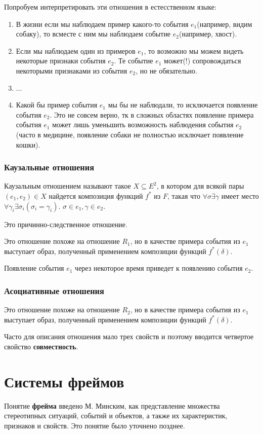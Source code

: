 Попробуем интерпретировать эти отношения в естесственном языке:
\begin{enumerate}
	\item В жизни если мы наблюдаем пример какого-то события $e_1$(например, видим собаку), то всместе с ним мы наблюдаем событие $e_2$(например, хвост).
	\item Если мы наблюдаем один из примеров $e_1$, то возможно мы можем видеть некоторые признаки события $e_2$. Те событие $e_1$ может(!) сопровождаться некоторыми признаками из события $e_2$, но не обязательно.
	\item ...
	\item Какой бы пример события $e_1$ мы бы не наблюдали, то исключается появление события $e_2$. Это не совсем верно, тк в сложных областях появление примера события $e_1$ может лишь уменьшить возможность наблюдения события $e_2$(часто в медицине, появление собаки не полностью исключает появление кошки).
\end{enumerate}

\subsubsection{Каузальные отношения}
Каузальным отношением называют такое $X\subseteq{}E^2$, в котором для всякой пары $(e_1,e_2)\in{}X$ найдется композиция функций $f^{*}$ из $F$, такая что $\forall\sigma\exists\gamma$ имеет место $\forall{}\gamma_i\exists\sigma_i(\sigma_i=\gamma_i)$. $\sigma\in{}e_1,\gamma\in{}e_2$.

Это причинно-следственное отношение.

Это отношение похоже на отношение $R_1$, но в качестве примера события из $e_1$ выступает образ, полученный применением композиции функций $f^{*}(\delta)$.

Появление события $e_1$ через некоторое время приведет к появлению события $e_2$.

\subsubsection{Асоциативные отношения}
Это отношение похоже на отношение $R_2$, но в качестве примера события из $e_1$ выступает образ, полученный применением композиции функций $f^{*}(\delta)$.

Часто для описания отношения мало трех свойств и поэтому вводится четвертое свойство \textbf{совместность}.

\section{Системы фреймов}
Понятие \textbf{фрейма} введено М. Минским, как представление множества стереотипных ситуаций, событий и объектов, а также их характеристик, признаков и свойств. Это понятие было уточнено позднее. 

